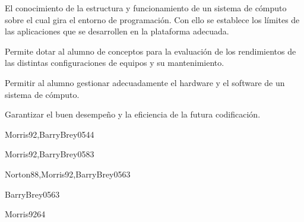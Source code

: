 \begin{syllabus}


\begin{justification}
El conocimiento de la estructura y funcionamiento de un sistema de cómputo sobre el cual gira el entorno de programación. Con ello se establece los límites de las aplicaciones que se desarrollen en la plataforma adecuada.

Permite dotar al alumno de conceptos para la evaluación de los rendimientos de las distintas configuraciones de equipos y su mantenimiento.
\end{justification}

\begin{goals}
\item Permitir al alumno gestionar adecuadamente el hardware y el software de un sistema de cómputo.
\item Garantizar el buen desempeño y la eficiencia de la futura codificación.
\end{goals}

\begin{outcomes}
\end{outcomes}

\begin{unit}{\ARDigitalLogicAndDataRepresentationDef}{Morris92,BarryBrey05}{4}{4}
   \ARDigitalLogicAndDataRepresentationAllTopics
   \ARDigitalLogicAndDataRepresentationAllObjectives
\end{unit}

\begin{unit}{\ARComputerArchitectureOrganizationDef}{Morris92,BarryBrey05}{8}{3}
   \ARComputerArchitectureOrganizationAllTopics
    \ARComputerArchitectureOrganizationAllObjectives
\end{unit}

\begin{unit}{\ARMemoryArchitectureDef}{Norton88,Morris92,BarryBrey05}{6}{3}
    \ARMemoryArchitectureAllTopics
    \ARMemoryArchitectureAllObjectives
\end{unit}

\begin{unit}{\ARInterfacingAndIOStrategiesDef}{BarryBrey05}{6}{3}
    \ARInterfacingAndIOStrategiesAllTopics
    \ARInterfacingAndIOStrategiesAllObjectives
\end{unit}

\begin{unit}{\ARFunctionalOrganizationDef}{Morris92}{6}{4}
    \ARFunctionalOrganizationAllTopics
    \ARFunctionalOrganizationAllObjectives
\end{unit}


\end{syllabus}
